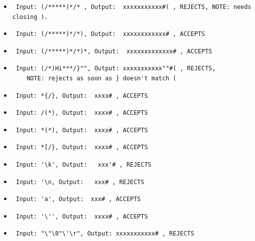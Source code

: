 \documentclass{article}
\begin{document}
\begin{itemize}
    \item \begin{verbatim} Input: (/*****)*/* , Output:  xxxxxxxxxxx#( , REJECTS, NOTE: needs closing ). \end{verbatim}
    \item \begin{verbatim} Input: (/*****)*/*), Output:  xxxxxxxxxxxx# , ACCEPTS \end{verbatim}
    \item \begin{verbatim} Input: (/*****)*/*)*, Output:  xxxxxxxxxxxxx# , ACCEPTS \end{verbatim}
    \item \begin{verbatim} Input: (/*)Hi***/}"", Output: xxxxxxxxxxx""#( , REJECTS,
    NOTE: rejects as soon as } doesn't match ( \end{verbatim}
    \item \begin{verbatim} Input: *{/}, Output:  xxxx# , ACCEPTS \end{verbatim}
    \item \begin{verbatim} Input: /(*), Output:  xxxx# , ACCEPTS \end{verbatim}
    \item \begin{verbatim} Input: *(*), Output:  xxxx# , ACCEPTS \end{verbatim}
    \item \begin{verbatim} Input: *[/}, Output:  xxxx# , ACCEPTS \end{verbatim}
    \item \begin{verbatim} Input: '\k', Output:   xxx'# , REJECTS \end{verbatim}
    \item \begin{verbatim} Input: '\n, Output:   xxx# , REJECTS \end{verbatim}
    \item \begin{verbatim} Input: 'a', Output:  xxx# , ACCEPTS \end{verbatim}
    \item \begin{verbatim} Input: '\'', Output:  xxxx# , ACCEPTS \end{verbatim}
    \item \begin{verbatim} Input: "\"\0"\'\r", Output: xxxxxxxxxxx# , REJECTS \end{verbatim}

\end{itemize}
\end{document}
